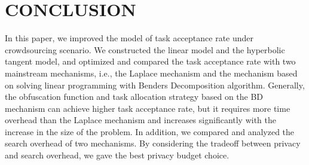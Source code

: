 \section{CONCLUSION}
In this paper, we improved the model of task acceptance rate under crowdsourcing scenario. We constructed the linear model and the hyperbolic tangent model, and optimized and compared the task acceptance rate with two mainstream mechanisms, i.e., the Laplace mechanism and the mechanism based on solving linear programming with Benders Decomposition algorithm. Generally, the obfuscation function and task allocation strategy based on the BD mechanism can achieve higher task acceptance rate, but it requires more time overhead than the Laplace mechanism and increases significantly with the increase in the size of the problem. In addition, we compared and analyzed the search overhead of two mechanisms. By considering the tradeoff between privacy and search overhead, we gave the best privacy budget choice.
